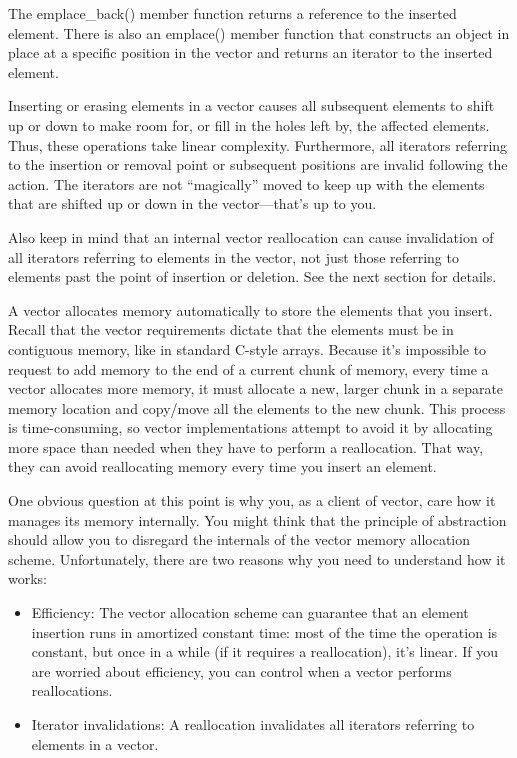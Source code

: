 The emplace\_back() member function returns a reference to the inserted element. There is also an emplace() member function that constructs an object in place at a specific position in the vector and returns an iterator to the inserted element.


Inserting or erasing elements in a vector causes all subsequent elements to shift up or down to make room for, or fill in the holes left by, the affected elements. Thus, these operations take linear complexity. Furthermore, all iterators referring to the insertion or removal point or subsequent positions are invalid following the action. The iterators are not “magically” moved to keep up with the elements that are shifted up or down in the vector—that’s up to you.

Also keep in mind that an internal vector reallocation can cause invalidation of all iterators referring to elements in the vector, not just those referring to elements past the point of insertion or deletion. See the next section for details.


A vector allocates memory automatically to store the elements that you insert. Recall that the vector requirements dictate that the elements must be in contiguous memory, like in standard C-style arrays. Because it’s impossible to request to add memory to the end of a current chunk of memory, every time a vector allocates more memory, it must allocate a new, larger chunk in a separate memory location and copy/move all the elements to the new chunk. This process is time-consuming, so vector implementations attempt to avoid it by allocating more space than needed when they have to perform a reallocation. That way, they can avoid reallocating memory every time you insert an element.

One obvious question at this point is why you, as a client of vector, care how it manages its memory internally. You might think that the principle of abstraction should allow you to disregard the internals of the vector memory allocation scheme. Unfortunately, there are two reasons why you need to understand how it works:

\begin{itemize}
\item
Efficiency: The vector allocation scheme can guarantee that an element insertion runs in amortized constant time: most of the time the operation is constant, but once in a while (if it requires a reallocation), it’s linear. If you are worried about efficiency, you can control when a vector performs reallocations.

\item
Iterator invalidations: A reallocation invalidates all iterators referring to elements in a vector.
\end{itemize}

